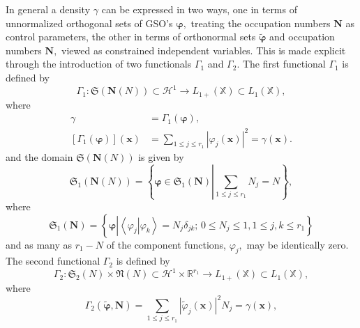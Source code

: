 \documentclass[aps,preprint]{revtex4}%
\begin{document}
In general a density $\gamma$ can be expressed in two ways, one in terms of
unnormalized orthogonal sets of GSO's $\mathbf{\varphi,}$ treating the
occupation numbers $\mathbf{N}$ as control parameters, the other in terms of
orthonormal sets $\mathbf{\tilde{\varphi}}$ and occupation numbers
$\mathbf{N,}$ viewed as constrained independent variables. This is made
explicit through the introduction of two functionals $\Gamma_{1}$ and
$\Gamma_{2}.$ The first functional $\Gamma_{1}$ is defined by
\begin{equation}
\Gamma_{1}:\mathfrak{S}\left(  \mathbf{N}\left(  N\right)  \right)
\subset\mathcal{H}^{1}\rightarrow L_{1+}\left(  \mathbb{X}\right)  \subset
L_{1}\left(  \mathbb{X}\right)  ,
\end{equation}
where%
\begin{align}
\gamma &  =\Gamma_{1}\left(  \mathbf{\varphi}\right)  ,\nonumber\\
\left[  \Gamma_{1}\left(  \mathbf{\varphi}\right)  \right]  \left(
\mathbf{x}\right)   &  =\sum_{1\leq j\leq r_{1}}\left\vert \varphi_{j}\left(
\mathbf{x}\right)  \right\vert ^{2}=\gamma\left(  \mathbf{x}\right)  .
\label{Gamma}%
\end{align}
and the domain $\mathfrak{S}\left(  \mathbf{N}\left(  N\right)  \right)  $ is
given by
\begin{equation}
\mathfrak{S}_{1}\left(  \mathbf{N}\left(  N\right)  \right)  =\left\{
\mathbf{\varphi\in}\mathfrak{S}_{1}\left(  \mathbf{N}\right)  \left\vert
\sum_{1\leq j\leq r_{1}}N_{j}=N\right.  \right\}  ,
\end{equation}
where
\begin{equation}
\mathfrak{S}_{1}\left(  \mathbf{N}\right)  =\left\{  \mathbf{\varphi
}\left\vert \left\langle \left.  \varphi_{j}\right\vert \varphi_{k}%
\right\rangle =N_{j}\delta_{jk};\,0\leq N_{j}\leq1,1\leq j,k\leq r_{1}\right.
\right\}
\end{equation}
and as many as $r_{1}-N$ of the component functions, $\varphi_{j},$ may be
identically zero. The second functional $\Gamma_{2}$ is defined by
\begin{equation}
\Gamma_{2}:\mathfrak{S}_{2}\left(  N\right)  \times\mathfrak{N}\left(
N\right)  \subset\mathcal{H}^{1}\times\mathbb{R}^{r_{1}}\rightarrow
L_{1+}\left(  \mathbb{X}\right)  \subset L_{1}\left(  \mathbb{X}\right)  ,
\end{equation}
where
\begin{equation}
\Gamma_{2}\left(  \mathbf{\tilde{\varphi},N}\right)  =\sum_{1\leq j\leq r_{1}%
}\left\vert \tilde{\varphi}_{j}\left(  \mathbf{x}\right)  \right\vert
^{2}N_{j}=\gamma\left(  \mathbf{x}\right)  , \label{GammaN}%
\end{equation}
\end{document}
